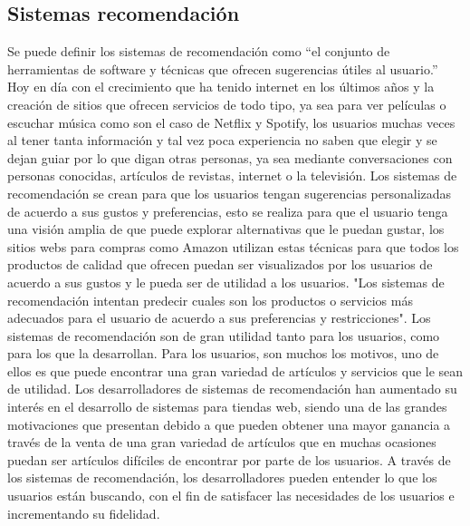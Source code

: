 \documentclass[12pt,letterpaper,openany]{book}
\begin{document}
\subsection{Sistemas recomendación}
Se puede definir los sistemas de recomendación como ``el conjunto de herramientas de software y técnicas que ofrecen sugerencias útiles al usuario.'' Hoy en día con el crecimiento que ha tenido internet en los últimos años y la creación de sitios que ofrecen servicios de todo tipo, ya sea para ver películas o escuchar música como son el caso de Netflix y Spotify, los usuarios muchas veces al tener tanta información y tal vez poca experiencia no saben que elegir y se dejan guiar por lo que digan otras personas, ya sea mediante conversaciones con personas conocidas, artículos de revistas, internet o la televisión.
\vspace{5mm}\newline
Los sistemas de recomendación se crean para que los usuarios tengan sugerencias personalizadas de acuerdo a sus gustos y preferencias, esto se realiza para que el usuario tenga una visión amplia de que puede explorar alternativas que le puedan gustar, los sitios webs para compras como Amazon utilizan estas técnicas para que todos los productos de calidad que ofrecen puedan ser visualizados por los usuarios de acuerdo a sus gustos y le pueda ser de utilidad a los usuarios. "Los sistemas de recomendación intentan predecir cuales son los productos o servicios más adecuados para el usuario de acuerdo a sus preferencias y restricciones".
\vspace{5mm}\newline
Los sistemas de recomendación son de gran utilidad tanto para los usuarios, como para los que la desarrollan. Para los usuarios, son muchos los motivos, uno de ellos es que puede encontrar una gran variedad de artículos y servicios que le sean de utilidad. Los desarrolladores de sistemas de recomendación han aumentado su interés en el desarrollo de sistemas para tiendas web, siendo una de las grandes motivaciones que presentan debido a que pueden obtener una mayor ganancia a través de la venta de una gran variedad de artículos que en muchas ocasiones puedan ser artículos difíciles de encontrar por parte de los usuarios. 
\vspace{5mm}\newline
A través de los sistemas de recomendación, los desarrolladores pueden entender lo que los usuarios están buscando, con el fin de satisfacer las necesidades de los usuarios e incrementando su fidelidad\cite{13}. 
\end{document}
